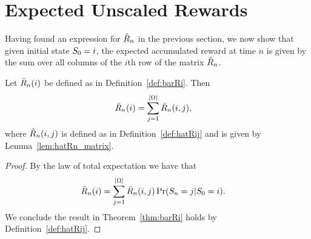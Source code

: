 \section{Expected Unscaled Rewards}
\label{subsec:unscaled_rewards}





Having found an expression for $\hat{R}_{n}$ in the previous section, we now show that given initial state $S_{0} = i$, the expected accumulated reward at time $n$ is given by the sum over all columns of the $i$th row of the matrix $\hat{R}_{n}$.

\begin{theorem}
\label{thm:barRi}
	Let $\bar{R}_{n}(i)$ be defined as in Definition~\ref{def:barRi}.  Then
\begin{align}
	\bar{R}_{n}(i) &=  \sum_{j = 1}^{|\Omega|} \hat{R}_{n}(i, j),
\end{align}
where $\hat{R}_{n}(i, j)$ is defined as in Definition~\ref{def:hatRij} and is given by Lemma~\ref{lem:hatRn_matrix}.
\end{theorem}
\begin{proof}
	By the law of total expectation we have that 
	\setcounter{cnt}{1}
	\begin{align}
		\bar{R}_{n}(i) &= \sum_{j = 1}^{|\Omega|} \bar{R}_{n}(i, j) \operatorname{Pr}(S_{n} = j | S_{0} = i).
	\end{align}
	We conclude the result in Theorem~\ref{thm:barRi} holds by Definition~\ref{def:hatRij}.
\end{proof}

